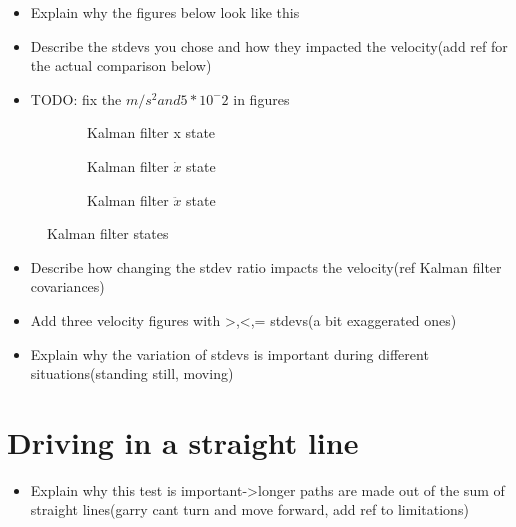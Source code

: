 \begin{itemize}
 \item Explain why the figures below look like this
 \item Describe the stdevs you chose and how they impacted the velocity(add ref for the actual comparison below)
 \item TODO: fix the $m/s^2 and 5*10^-2$ in figures
\end{itemize}

\begin{figure}[H]
 \flushleft
 \begin{subfigure}[c]{0.8\textwidth}
  \label{RobotDistSim}
  \caption{Kalman filter x state}
 \end{subfigure}
 \hfill
 \begin{subfigure}[c]{0.8\textwidth}
  \label{RobotVelSim}
  \caption{Kalman filter $\dot{x}$ state}
 \end{subfigure}
 \hfill
 \begin{subfigure}[c]{0.8\textwidth}
  \label{RobotAccelSim}
  \caption{Kalman filter $\ddot{x}$ state}
 \end{subfigure}
 \caption{Kalman filter states}
\end{figure}

\begin{itemize}
 \item Describe how changing the stdev ratio impacts the velocity(ref Kalman filter covariances)
 \item Add three velocity figures with >,<,= stdevs(a bit exaggerated ones)
 \item Explain why the variation of stdevs is important during different situations(standing still, moving)
\end{itemize}

\section{Driving in a straight line}\label{sec:straight_line}

\begin{itemize}
 \item Explain why this test is important->longer paths are made out of the sum of straight lines(garry cant turn and move forward, add ref to limitations)
\end{itemize}

